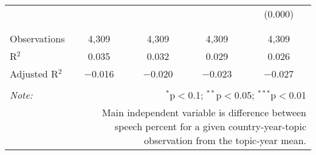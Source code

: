 \begin{table}[!htbp]
\begin{tabular}{@{\extracolsep{5pt}}lcccc}
  &  &  &  & (0.000) \\ 
  & & & & \\ 
\hline \\[-1.8ex] 
Observations & 4,309 & 4,309 & 4,309 & 4,309 \\ 
R$^{2}$ & 0.035 & 0.032 & 0.029 & 0.026 \\ 
Adjusted R$^{2}$ & $-$0.016 & $-$0.020 & $-$0.023 & $-$0.027 \\ 
\hline 
\hline \\[-1.8ex] 
\textit{Note:}  & \multicolumn{4}{r}{$^{*}$p$<$0.1; $^{**}$p$<$0.05; $^{***}$p$<$0.01} \\ 
 & \multicolumn{4}{r}{Main independent variable is difference between speech percent for a given country-year-topic observation from the topic-year mean.} \\ 
\end{tabular} 
\end{table} 

